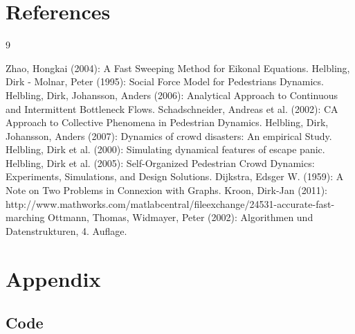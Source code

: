 \documentclass[11pt]{article}
\begin{document}

\section{References}

\begin{thebibliography} {9}
	
	 Zhao, Hongkai (2004): A Fast Sweeping Method for Eikonal Equations.
	 Helbling, Dirk - Molnar, Peter (1995): Social Force Model for Pedestrians Dynamics.
	 Helbling, Dirk, Johansson, Anders (2006): Analytical Approach to Continuous and Intermittent Bottleneck Flows.
	 Schadschneider, Andreas et al. (2002): CA Approach to Collective Phenomena in Pedestrian Dynamics.	
	 Helbling, Dirk, Johansson, Anders (2007): Dynamics of crowd disasters: An empirical Study.
	 Helbling, Dirk et al. (2000): Simulating dynamical features of escape panic.
	 Helbling, Dirk et al. (2005): Self-Organized Pedestrian Crowd Dynamics: Experiments, Simulations, and Design Solutions.
	 Dijkstra, Edsger W. (1959): A Note on Two Problems in Connexion with Graphs.
	 Kroon, Dirk-Jan (2011): http://www.mathworks.com/matlabcentral/fileexchange/24531-accurate-fast-marching
	 Ottmann, Thomas, Widmayer, Peter (2002): Algorithmen und Datenstrukturen, 4. Auflage.

\end{thebibliography}


\section{Appendix}

\subsection{Code}

\lstset{language=Matlab,breaklines=true}

















\end{document}
